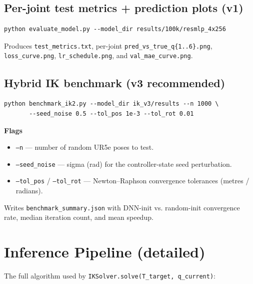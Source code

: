 \documentclass[11pt]{article}
\begin{document}
\subsection{Per-joint test metrics + prediction plots (v1)}

\begin{lstlisting}[style=shell]
python evaluate_model.py --model_dir results/100k/resmlp_4x256
\end{lstlisting}

\noindent Produces \texttt{test\_metrics.txt}, per-joint
\texttt{pred\_vs\_true\_q\{1..6\}.png}, \texttt{loss\_curve.png},
\texttt{lr\_schedule.png}, and \texttt{val\_mae\_curve.png}.

\subsection{Hybrid IK benchmark (v3 recommended)}

\begin{lstlisting}[style=shell]
python benchmark_ik2.py --model_dir ik_v3/results --n 1000 \
       --seed_noise 0.5 --tol_pos 1e-3 --tol_rot 0.01
\end{lstlisting}

\noindent\textbf{Flags}
\begin{itemize}[leftmargin=*]
    \item \texttt{--n} --- number of random UR5e poses to test.
    \item \texttt{--seed\_noise} --- sigma (rad) for the controller-state
          seed perturbation.
    \item \texttt{--tol\_pos} / \texttt{--tol\_rot} --- Newton--Raphson
          convergence tolerances (metres / radians).
\end{itemize}

\noindent Writes \texttt{benchmark\_summary.json} with DNN-init vs.
random-init convergence rate, median iteration count, and mean speedup.

\section{Inference Pipeline (detailed)}

The full algorithm used by \texttt{IKSolver.solve(T\_target, q\_current)}:
\end{document}
